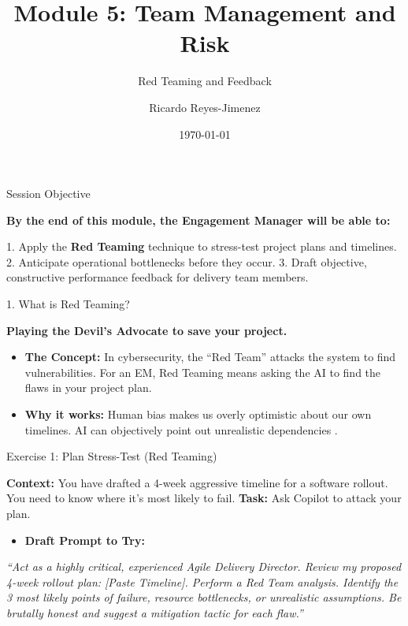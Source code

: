 \documentclass[aspectratio=169]{beamer}
\title[Module 5: Team Management and ]{Module 5: Team Management and Risk}
\subtitle{Red Teaming and Feedback}
\author{Ricardo Reyes-Jimenez}
\institute{Capgemini}
\date{\today}
\begin{document}
\begin{frame}
  \titlepage
\end{frame}

\usebackgroundtemplate{}



\begin{frame}[fragile]{Session Objective}


\textbf{By the end of this module, the Engagement Manager will be able to:}

1. Apply the \textbf{Red Teaming} technique to stress-test project plans and timelines.
2. Anticipate operational bottlenecks before they occur.
3. Draft objective, constructive performance feedback for delivery team members.

\end{frame}



\begin{frame}[fragile]{1. What is Red Teaming?}


\textbf{Playing the Devil's Advocate to save your project.}

\begin{itemize}
  \item \textbf{The Concept:} In cybersecurity, the ``Red Team'' attacks the system to find vulnerabilities. For an EM, Red Teaming means asking the AI to find the flaws in your project plan.
  \item \textbf{Why it works:} Human bias makes us overly optimistic about our own timelines. AI can objectively point out unrealistic dependencies \cite{redteam2026}.
\end{itemize}
\end{frame}



\begin{frame}[fragile]{Exercise 1: Plan Stress-Test (Red Teaming)}


\textbf{Context:} You have drafted a 4-week aggressive timeline for a software rollout. You need to know where it's most likely to fail.
\textbf{Task:} Ask Copilot to attack your plan.

\begin{itemize}
  \item \textbf{Draft Prompt to Try:}
\end{itemize}
\textit{``Act as a highly critical, experienced Agile Delivery Director. Review my proposed 4-week rollout plan: [Paste Timeline]. Perform a Red Team analysis. Identify the 3 most likely points of failure, resource bottlenecks, or unrealistic assumptions. Be brutally honest and suggest a mitigation tactic for each flaw.''}

\end{frame}
\end{document}
